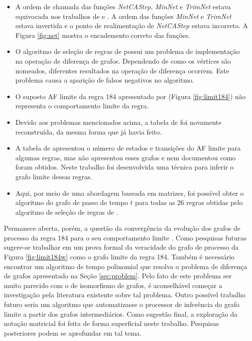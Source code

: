 \documentclass[12pt,a4paper]{article}
\begin{document}
\begin{itemize}
\item A ordem de chamada das funções \emph{NetCAStep}, \emph{MinNet} e \emph{TrimNet} estava
equivocada nos trabalhos de  e .
A ordem das funções \emph{MinNet} e \emph{TrimNet} estava invertida e o ponto de
realimentação de \emph{NetCAStep} estava incorreto. A Figura \ref{fig:net} mostra o
encademento correto das funções.

\item O algoritmo de seleção de regras de  possui
um problema de implementação na operação de diferença de grafos. Dependendo
de como os vértices são nomeados, diferentes resultados na operação de
diferença ocorrem. Este problema causa a aparição de falsos negativos no
algoritmo.

\item O suposto AF limite da regra 184 apresentado por 
(Figura \ref{fig:limit184}) não representa o comportamento limite da regra.

\item Devido aos problemas mencionados acima, a tabela de
 foi novamente reconstruída, da mesma forma que
 já havia feito.

\item A tabela de  apresentou o número de estados
e transições do AF limite para algumas regras, mas não
apresentou esses grafos e nem documentou como foram obtidos. Neste trabalho
foi desenvolvida uma técnica para inferir o grafo limite dessas regras.

\item Aqui, por meio de uma abordagem baseada em matrizes, foi possível
obter o algoritmo do grafo de passo de tempo $t$ para todas as 26 regras
obtidas pelo algoritmo de seleção de regras de .
\end{itemize}

Permanece aberta, porém, a questão da convergência da evolução dos grafos
de processo da regra 184 para o seu comportamento limite .
Como pesquisas futuras sugere-se trabalhar em um prova formal da veracidade
do grafo de processo da Figura \ref{fig:limit184w} como o grafo limite da regra
184. Também é necessário encontrar um algoritmo de tempo polinomial que resolva
o problema de diferença de grafos apresentado na Seção \ref{sec:problem}.
Pelo fato de este problema ser muito parecido com o de isomorfismo de grafos,
é aconselhável começar a investigação pela literatura existente sobre tal
problema. Outro possível trabalho futuro seria um algoritmo que automatizasse
o processor de inferência do grafo limite a partir dos grafos intermediários.
Como sugestão final, a exploração da notação matricial foi feita de forma
superficial neste trabalho.  Pesquisas posteriores podem se aprofundar em
tal tema.
\end{document}
